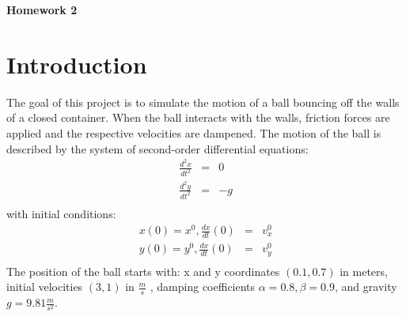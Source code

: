 \documentclass[12pt]{article}
\begin{document}
\centerline{\Large\textbf{Homework 2}}
\vspace{2cm}

\section{Introduction}\label{sec::Intro}
The goal of this project is to simulate the motion of a ball bouncing off the walls of a closed container.  When the ball interacts with the walls, friction forces are applied and the respective velocities are dampened.  The motion of the ball is described by the
system of second-order differential equations:
 \begin{eqnarray}
\frac{d^2x}{dt^2} &= &0 \\\nonumber
\frac{d^2y}{dt^2} &= &-g\\\nonumber
       \end{eqnarray}
with initial conditions:
 \begin{eqnarray}
x(0) = x^0, \frac{dx}{dt}(0) &= &v^0_x \\\nonumber
y(0) = y^0, \frac{dx}{dt}(0) &= &v^0_y \\\nonumber
       \end{eqnarray}
The position of the ball starts with: x and y coordinates $ (0.1, 0.7)$ in meters, initial velocities $(3,1)$ in  $\frac{m}{s}$ , damping coefficients $\alpha = 0.8, \beta = 0.9$, and gravity $g = 9.81 \frac{m}{s^2}$.
\end{document}

